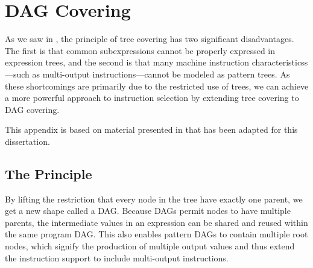 %

\chapter{DAG Covering}


As we saw in , the \gls{principle} of \gls{tree
  covering} has two significant disadvantages.
%
The first is that common subexpressions cannot be properly expressed in
\glspl{expression tree}, and the second is that many \glspl{machine instruction
  characteristics}---such as \glspl{multi-output instruction}---cannot be
modeled as \glspl{pattern tree}.
%
As these shortcomings are primarily due to the restricted use of
\glspl{tree}, we can achieve a more powerful approach to \gls{instruction
  selection} by extending \gls{tree covering} to \gls{DAG covering}.

This appendix is based on material presented in
\cite[Chap.]{HjortBlindell:2016:Survey} that has been adapted for
this dissertation.


\section{The Principle}


%
By lifting the restriction that every \gls{node} in the tree have exactly one
\gls{parent}, we get a new shape called a \gls{DAG}.
%
Because \glspl{DAG} permit
\glspl{node} to have multiple \glspl{parent}, the intermediate values in an
expression can be shared and reused within the same \gls{program DAG}.
%
This also
enables \glspl{pattern DAG} to contain multiple \gls{root} \glspl{node}, which
signify the production of multiple output values and thus extend the
\gls{instruction} support to include \glspl{multi-output instruction}.

